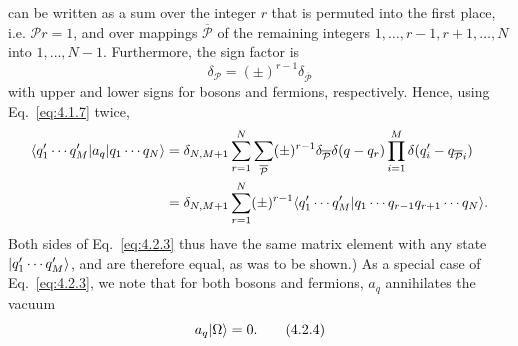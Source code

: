 can be written as a sum over the integer $r$ that is permuted into the
first place, i.e. $\mathcal P r=1$, and over mappings $\overline{\mathcal P}$ of the remaining integers
$1,\ldots,r-1,r+1,\ldots,N$ into $1,\ldots,N-1$. Furthermore, the sign factor is
\[
  \delta_{\mathcal P}=(\pm)^{r-1}\delta_{\overline{\mathcal P}}
\]
with upper and lower signs for bosons and fermions, respectively. Hence,
using Eq.~\eqref{eq:4.1.7} twice,
\begin{align*}
  \langle q'_1\cdots q'_M\rvert a_q\lvert q_1\cdots q_N\rangle
  ={}& \delta_{N,M+1}
  \sum_{r=1}^{N}\sum_{\overline{\mathcal P}}(\pm)^{r-1}
  \delta_{\overline{\mathcal P}}\delta(q-q_r)
  \prod_{i=1}^{M}\delta(q'_i-q_{\overline{\mathcal P}i})
  \\
  ={}& \delta_{N,M+1}\sum_{r=1}^{N}(\pm)^{r-1}
  \langle q'_1\cdots q'_M | q_1\cdots q_{r-1}q_{r+1}\cdots q_N\rangle.
\end{align*}
Both sides of Eq.~\eqref{eq:4.2.3} thus have the same matrix element with any state
$\lvert q'_1\cdots q'_M\rangle$, and are therefore equal, as was to be shown.) As a special case
of Eq.~\eqref{eq:4.2.3}, we note that for both bosons and fermions, $a_q$ annihilates
the vacuum
\begin{equation}
  a_q\lvert \Omega\rangle=0.
  \tag{4.2.4}
  \label{eq:4.2.4}
\end{equation}

